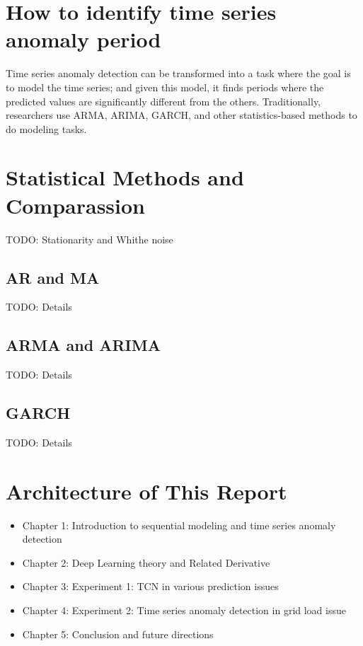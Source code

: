 \section{How to identify time series anomaly period}

Time series anomaly detection can be transformed into a task where the goal is to model the time series; and given this model, it finds periods where the predicted values are significantly different from the others. Traditionally, researchers use ARMA, ARIMA, GARCH, and other statistics-based methods to do modeling tasks.
\section{Statistical Methods and Comparassion}
TODO: Stationarity and Whithe noise
\subsection{AR and MA}
TODO: Details
\subsection{ARMA and ARIMA}
TODO: Details
\subsection{GARCH}
TODO: Details


\section{Architecture of This Report}

\begin{itemize}
\item Chapter 1: Introduction to sequential modeling and time series anomaly detection
\item Chapter 2: Deep Learning theory and Related Derivative
\item Chapter 3: Experiment 1: TCN in various prediction issues
\item Chapter 4: Experiment 2: Time series anomaly detection in grid load issue
\item Chapter 5: Conclusion and future directions
\end{itemize}
